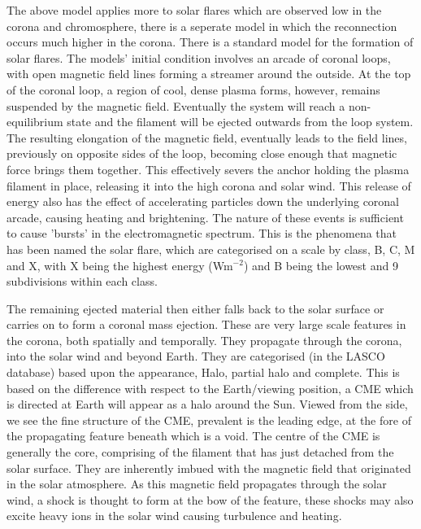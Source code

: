 The above model applies more to solar flares which are observed low in the corona and chromosphere, there is a seperate model in which the reconnection occurs much higher in the corona.
There is a standard model for the formation of solar flares.
The models' initial condition involves an arcade of coronal loops, with open magnetic field lines forming a streamer around the outside.
At the top of the coronal loop, a region of cool, dense plasma forms, however, remains suspended by the magnetic field.
Eventually the system will reach a non-equilibrium state and the filament will be ejected outwards from the loop system.
The resulting elongation of the magnetic field, eventually leads to the field lines, previously on opposite sides of the loop, becoming close enough that magnetic force brings them together.
This effectively severs the anchor holding the plasma filament in place, releasing it into the high corona and solar wind. 
This release of energy also has the effect of accelerating particles down the underlying coronal arcade, causing heating and brightening.
The nature of these events is sufficient to cause 'bursts' in the electromagnetic spectrum.
This is the phenomena that has been named the solar flare, which are categorised on a scale by class, B, C, M and X, with X being the highest energy (Wm$^{-2}$) and B being the lowest and 9 subdivisions within each class. 

The remaining ejected material then either falls back to the solar surface or carries on to form a coronal mass ejection.
These are very large scale features in the corona, both spatially and temporally.
They propagate through the corona, into the solar wind and beyond Earth.
They are categorised (in the LASCO database) based upon the appearance, Halo, partial halo and complete.
This is based on the difference with respect to the Earth/viewing position, a CME which is directed at Earth will appear as a halo around the Sun.
Viewed from the side, we see the fine structure of the CME, prevalent is the leading edge, at the fore of the propagating feature beneath which is a void.
The centre of the CME is generally the core, comprising of the filament that has just detached from the solar surface.
They are inherently imbued with the magnetic field that originated in the solar atmosphere.
As this magnetic field propagates through the solar wind, a shock is thought to form at the bow of the feature, these shocks may also excite heavy ions in the solar wind causing turbulence and heating.

